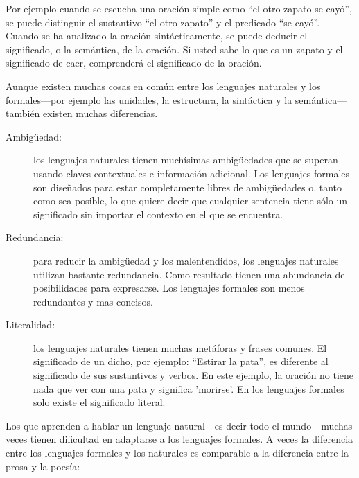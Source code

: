 
Por ejemplo cuando se escucha una oración simple como ``el otro zapato
se cayó'', se puede distinguir el sustantivo ``el otro zapato''
y el predicado ``se cayó''. Cuando se ha analizado la oración sintácticamente,
se puede deducir el significado, o la semántica, de la oración. Si
usted sabe lo que es un zapato y el significado de caer, comprenderá
el significado de la oración.

Aunque existen muchas cosas en común entre los lenguajes naturales
y los formales—por ejemplo las unidades, la estructura, la sintáctica
y la semántica— también existen muchas diferencias.

  
\begin{description}
\item [{Ambigüedad:}] los lenguajes naturales tienen muchísimas ambigüedades
que se superan usando claves contextuales e información adicional.
Los lenguajes formales son diseñados para estar completamente libres
de ambigüedades o, tanto como sea posible, lo que quiere decir que
cualquier sentencia tiene sólo un significado sin importar el contexto
en el que se encuentra.
\item [{Redundancia:}] para reducir la ambigüedad y los malentendidos,
los lenguajes naturales utilizan bastante redundancia. Como resultado
tienen una abundancia de posibilidades para expresarse. Los lenguajes
formales son menos redundantes y mas concisos.
\item [{Literalidad:}] los lenguajes naturales tienen muchas metáforas
y frases comunes. El significado de un dicho, por ejemplo: ``Estirar
la pata'', es diferente al significado de sus sustantivos y verbos.
En este ejemplo, la oración no tiene nada que ver con una pata y significa
'morirse'. En los lenguajes formales solo existe el significado literal.
\end{description}
Los que aprenden a hablar un lenguaje natural—es decir todo el mundo—muchas
veces tienen dificultad en adaptarse a los lenguajes formales. A veces
la diferencia entre los lenguajes formales y los naturales es comparable
a la diferencia entre la prosa y la poesía:

